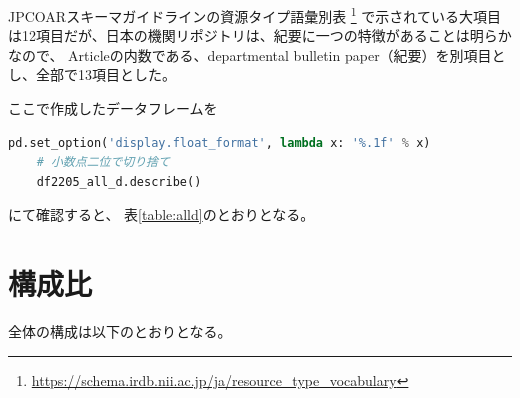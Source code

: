 \documentclass[submit,noauthor]{ono}
\begin{document}
JPCOARスキーマガイドラインの資源タイプ語彙別表
\footnote{\url{https://schema.irdb.nii.ac.jp/ja/resource_type_vocabulary}}
で示されている大項目は12項目だが、日本の機関リポジトリは、紀要に一つの特徴があることは明らかなので、
Articleの内数である、departmental bulletin paper（紀要）を別項目とし、全部で13項目とした。

ここで作成したデータフレームを

\begin{lstlisting}[language=Python,breaklines]
	pd.set_option('display.float_format', lambda x: '%.1f' % x)
	# 小数点二位で切り捨て
	df2205_all_d.describe()
\end{lstlisting}

にて確認すると、
表\ref{table:alld}のとおりとなる。


\section{構成比}
全体の構成は以下のとおりとなる。
\end{document}
